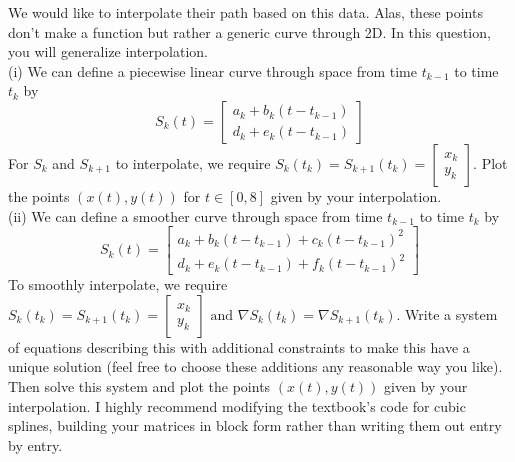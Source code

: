 \documentclass[11pt]{article}
\begin{document}
We would like to interpolate their path based on this data. Alas, these points don't make a function but rather a generic curve through 2D. In this question, you will generalize interpolation.\\ 

\noindent (i) We can define a piecewise linear curve through space from time $t_{k-1}$ to time $t_k$ by
$$S_k(t) = \begin{bmatrix} a_k + b_k (t-t_{k-1}) \\ d_k + e_k (t-t_{k-1}) \end{bmatrix} $$
For $S_k$ and $S_{k+1}$ to interpolate, we require 
$ S_k(t_k) = S_{k+1}(t_{k}) = \begin{bmatrix} x_k \\ y_k \end{bmatrix}. $
Plot the points $(x(t),y(t))$ for $t\in[0,8]$ given by your interpolation.\\

\noindent (ii) We can define a smoother curve through space from time $t_{k-1}$ to time $t_k$ by
$$S_k(t) = \begin{bmatrix} a_k + b_k (t-t_{k-1}) + c_k  (t-t_{k-1})^2 \\ d_k + e_k (t-t_{k-1}) + f_k  (t-t_{k-1})^2 \end{bmatrix} $$
To smoothly interpolate, we require 
$ S_k(t_k) = S_{k+1}(t_{k}) = \begin{bmatrix} x_k \\ y_k \end{bmatrix} \text{ and } \nabla S_k(t_k) = \nabla S_{k+1}(t_{k}). $
Write a system of equations describing this with additional constraints to make this have a unique solution (feel free to choose these additions any reasonable way you like).
Then solve this system and plot the points $(x(t),y(t))$ given by your interpolation. I highly recommend modifying the textbook's code for cubic splines, building your matrices in block form rather than writing them out entry by entry.
\end{document}
